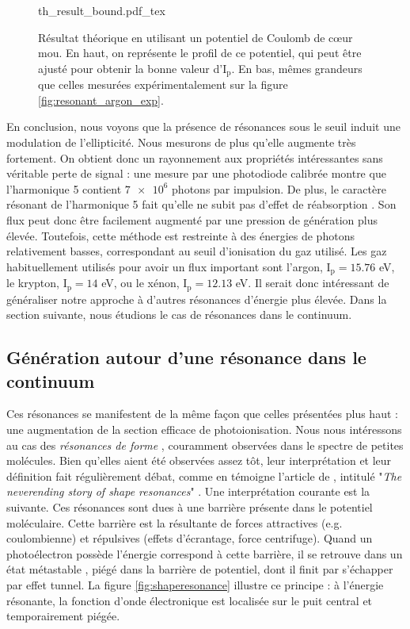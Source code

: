 \begin{figure}[!ht]
\centering
\def\svgwidth{1\columnwidth}
{th_result_bound.pdf_tex}
\caption{Résultat théorique en utilisant un potentiel de Coulomb de cœur mou. En haut, on représente le profil de ce potentiel, qui peut être ajusté pour obtenir la bonne valeur d'$\text{I}_{\text{p}}$. En bas, mêmes grandeurs que celles mesurées expérimentalement sur la figure \ref{fig:resonant_argon_exp}.}
\label{fig:resonant_argon_th_bound}
\end{figure}

En conclusion, nous voyons que la présence de résonances sous le seuil induit une modulation de l'ellipticité. Nous mesurons de plus qu'elle augmente très fortement. On obtient donc un rayonnement aux propriétés intéressantes sans véritable perte de signal : une mesure par une photodiode calibrée montre que l'harmonique 5 contient $\num{7e6}$ photons par impulsion. De plus, le caractère résonant de l'harmonique 5 fait qu'elle ne subit pas d'effet de réabsorption . Son flux peut donc être facilement augmenté par une pression de génération plus élevée.  Toutefois, cette méthode est restreinte à des énergies de photons relativement basses, correspondant au seuil d'ionisation du gaz utilisé. Les gaz habituellement utilisés pour avoir un flux important sont l'argon, $\text{I}_{\text{p}}=15.76$ eV, le krypton, $\text{I}_{\text{p}}=14$ eV, ou le xénon, $\text{I}_{\text{p}}=12.13$ eV. Il serait donc intéressant de généraliser notre approche à d'autres résonances d'énergie plus élevée. Dans la section suivante, nous étudions le cas de résonances dans le continuum.

\subsection{Génération autour d'une résonance dans le continuum}
Ces résonances se manifestent de la même façon que celles présentées plus haut : une augmentation de la section efficace de photoionisation. Nous nous intéressons au cas des \textit{résonances de forme} , couramment observées dans le spectre de petites molécules. Bien qu'elles aient été observées assez tôt, leur interprétation et leur définition fait régulièrement débat, comme en témoigne l'article de , intitulé "\textit{The neverending story of shape resonances}" . Une interprétation courante est la suivante. Ces résonances sont dues à une barrière présente dans le potentiel moléculaire. Cette barrière est la résultante de forces attractives (e.g. coulombienne) et répulsives (effets d'écrantage, force centrifuge). Quand un photoélectron possède l'énergie correspond à cette barrière, il se retrouve dans un état métastable , piégé dans la barrière de potentiel, dont il finit par s'échapper par effet tunnel. La figure \ref{fig:shaperesonance} illustre ce principe : à l'énergie résonante, la fonction d'onde électronique est localisée sur le puit central et temporairement piégée.

